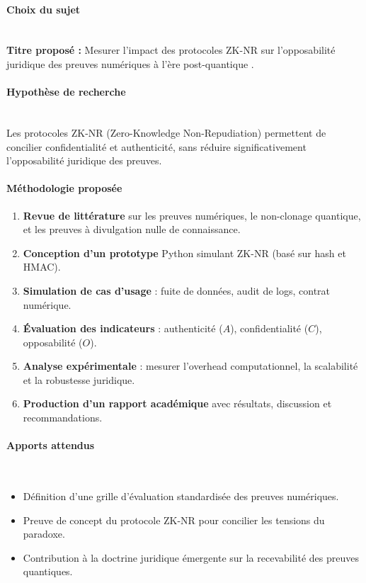 \documentclass[11pt]{article}
\begin{document}
\paragraph{Choix du sujet}  \\
\textbf{Titre proposé :} \og Mesurer l’impact des protocoles ZK-NR sur l’opposabilité juridique des preuves numériques à l’ère post-quantique \fg.

\paragraph{Hypothèse de recherche}\\
Les protocoles ZK-NR (Zero-Knowledge Non-Repudiation) permettent de concilier confidentialité et authenticité, 
sans réduire significativement l’opposabilité juridique des preuves.

\paragraph{Méthodologie proposée}
\begin{enumerate}
  \item \textbf{Revue de littérature} sur les preuves numériques, le non-clonage quantique, et les preuves à divulgation nulle de connaissance.
  \item \textbf{Conception d’un prototype} Python simulant ZK-NR (basé sur hash et HMAC).
  \item \textbf{Simulation de cas d’usage} : fuite de données, audit de logs, contrat numérique.
  \item \textbf{Évaluation des indicateurs} : authenticité ($A$), confidentialité ($C$), opposabilité ($O$).
  \item \textbf{Analyse expérimentale} : mesurer l’overhead computationnel, la scalabilité et la robustesse juridique.
  \item \textbf{Production d’un rapport académique} avec résultats, discussion et recommandations.
\end{enumerate}

\paragraph{Apports attendus}\\
\begin{itemize}
  \item Définition d’une grille d’évaluation standardisée des preuves numériques.
  \item Preuve de concept du protocole ZK-NR pour concilier les tensions du paradoxe.
  \item Contribution à la doctrine juridique émergente sur la recevabilité des preuves quantiques.
\end{itemize}
\newpage
\end{document}
